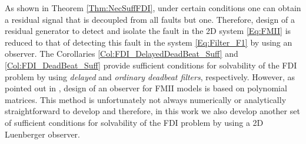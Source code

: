 \documentclass[journal,12pt,draftcls,onecolumn]{IEEEtran}
\begin{document}
As shown in Theorem \ref{Thm:NecSuffFDI}, under certain conditions one can obtain a residual signal that is decoupled from all faults but one. Therefore, design of a residual generator to detect and isolate the fault  in the 2D system \eqref{Eq:FMII} is reduced to that of detecting this fault in the system \eqref{Eq:Filter_F1} by using an observer. The Corollaries \ref{Col:FDI_DelayedDeadBeat_Suff} and \ref{Col:FDI_DeadBeat_Suff} provide sufficient conditions for solvability of the FDI problem by using \emph{delayed} and {\it ordinary deadbeat filters}, respectively. However, as pointed out in \cite{Bisiacco_Obs},  design of an observer for FMII models is based on polynomial matrices. This method is unfortunately not always numerically or analytically straightforward to develop and therefore, in this work we also develop another set of sufficient conditions for solvability of the FDI problem by using a 2D Luenberger observer.
\end{document}

